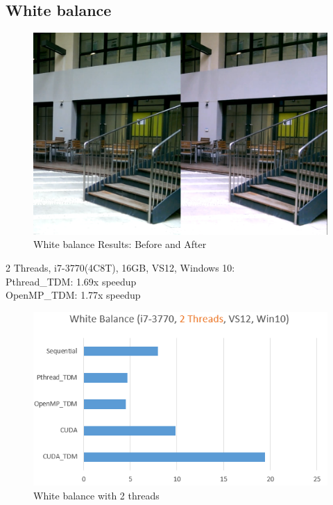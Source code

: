 \documentclass{acm_proc_article-sp}
\begin{document}
\subsection{White balance}
\begin{figure}[H]
  \includegraphics[width=\linewidth,natwidth=1230,natheight=844]{whitebalance_comparison.png}
  \caption{White balance Results: Before and After}
  \label{fig:whitebalance_comparison}
\end{figure}
2 Threads, i7-3770(4C8T), 16GB, VS12, Windows 10: \\
Pthread\_TDM: 1.69x speedup \\
OpenMP\_TDM: 1.77x speedup
\begin{figure}[H]
  \includegraphics[width=\linewidth,natwidth=569,natheight=336]{white2.png}
  \caption{White balance with 2 threads}
  \label{fig:white2}
\end{figure}
\end{document}
